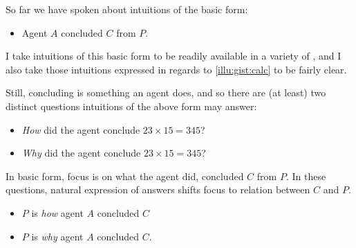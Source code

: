 \begin{note}
  So far we have spoken about intuitions of the basic form:

  \begin{itemize}
  \item
    Agent \(A\) concluded \(C\) from \(P\).
  \end{itemize}

  I take intuitions of this basic form to be readily available in a variety of , and I also take those intuitions expressed in regards to \autoref{illu:gist:calc} to be fairly clear.

  Still, concluding is something an agent does, and so there are (at least) two distinct questions intuitions of the above form may answer:

  \begin{itemize}
  \item
    \emph{How} did the agent conclude \(23 \times 15 = 345\)?
  \item
    \emph{Why} did the agent conclude \(23 \times 15 = 345\)?
  \end{itemize}

  In basic form, focus is on what the agent did, concluded \(C\) from \(P\).
  In these questions, natural expression of answers shifts focus to relation between \(C\) and \(P\).

  \begin{itemize}
  \item
    \(P\) is \emph{how} agent \(A\) concluded \(C\)
  \item
    \(P\) is \emph{why} agent \(A\) concluded \(C\).
  \end{itemize}
\end{note}

